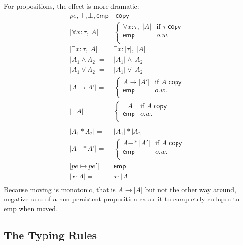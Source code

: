 \documentclass[acmsmall,nonacm]{acmart}
\newcommand{\wand}{\mathrel{-\!\!\ast}}
\newcommand{\core}[1]{\left| #1 \right|}
\begin{document}
For propositions, the effect is more dramatic:
\begin{align*}
  pe,\top,\bot,\mathsf{emp}&\;\mathsf{copy}\\
  \core{\forall x:\tau,\;A}={}& \begin{cases}
    \forall x:\tau,\;\core A&\mbox{if $\tau\;\mathsf{copy}$}\\
    \mathsf{emp}&o.w.\\
  \end{cases}\\
  \core{\exists x:\tau,\;A}={}&\exists x:\core\tau,\;\core A\\
  \core{A_1\land A_2}={}&\core{A_1}\land \core{A_2}\\
  \core{A_1\lor A_2}={}&\core{A_1}\lor \core{A_2}\\
  \core{A\to A'}={}& \begin{cases}
    A\to \core{A'}&\mbox{if $A\;\mathsf{copy}$}\\
    \mathsf{emp}&o.w.\\
  \end{cases}\\
  \core{\neg A}={}& \begin{cases}
    \neg A&\mbox{if $A\;\mathsf{copy}$}\\
    \mathsf{emp}&o.w.\\
  \end{cases}\\
\end{align*}
\begin{align*}
  \core{A_1\ast A_2}={}&\core{A_1}\ast \core{A_2}\\
  \core{A\wand A'}={}& \begin{cases}
    A\wand \core{A'}&\mbox{if $A\;\mathsf{copy}$}\\
    \mathsf{emp}&o.w.\\
  \end{cases}\\
  \core{pe\mapsto pe'}={}&\mathsf{emp}\\
  \core{\boxed{x:A}}={}&\boxed{x:\core{A}}\\
\end{align*}
Because moving is monotonic, that is $A\to \core A$ but not the other way around, negative uses of a non-persistent proposition cause it to completely collapse to \textsf{emp} when moved.

\subsection{The Typing Rules}
\end{document}
